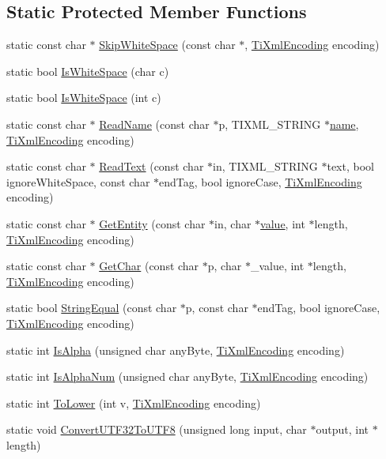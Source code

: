 \subsection*{Static Protected Member Functions}
\begin{DoxyCompactItemize}
\item 
static const char $\ast$ \hyperlink{classTiXmlBase_ac0c3d66d8a9e6996a1fa016275e16875}{SkipWhiteSpace} (const char $\ast$, \hyperlink{tinyxml_8h_a88d51847a13ee0f4b4d320d03d2c4d96}{TiXmlEncoding} encoding)
\item 
static bool \hyperlink{classTiXmlBase_af56296d561c0bab4bc8e198cdcf5c48e}{IsWhiteSpace} (char c)
\item 
static bool \hyperlink{classTiXmlBase_a3de391ea9f4c4a8aa10d04480b048795}{IsWhiteSpace} (int c)
\item 
static const char $\ast$ \hyperlink{classTiXmlBase_a1c21a6ab5f7b503acd91f35f183734b3}{ReadName} (const char $\ast$p, TIXML\_\-STRING $\ast$\hyperlink{classTiXmlAttribute_afcbe165f33f08cf9b24daa33f0ee951a}{name}, \hyperlink{tinyxml_8h_a88d51847a13ee0f4b4d320d03d2c4d96}{TiXmlEncoding} encoding)
\item 
static const char $\ast$ \hyperlink{classTiXmlBase_aa646c74921aa33156968b802bbf5566e}{ReadText} (const char $\ast$in, TIXML\_\-STRING $\ast$text, bool ignoreWhiteSpace, const char $\ast$endTag, bool ignoreCase, \hyperlink{tinyxml_8h_a88d51847a13ee0f4b4d320d03d2c4d96}{TiXmlEncoding} encoding)
\item 
static const char $\ast$ \hyperlink{classTiXmlBase_ac5c08bf3deffcda0bf8ce2958372b584}{GetEntity} (const char $\ast$in, char $\ast$\hyperlink{classTiXmlAttribute_ae9e4e5f442347434b1da43954cc1b411}{value}, int $\ast$length, \hyperlink{tinyxml_8h_a88d51847a13ee0f4b4d320d03d2c4d96}{TiXmlEncoding} encoding)
\item 
static const char $\ast$ \hyperlink{classTiXmlBase_a5b0fde72d6f662ae1fd6303195d2159b}{GetChar} (const char $\ast$p, char $\ast$\_\-value, int $\ast$length, \hyperlink{tinyxml_8h_a88d51847a13ee0f4b4d320d03d2c4d96}{TiXmlEncoding} encoding)
\item 
static bool \hyperlink{classTiXmlBase_a51631e6986179558b9e5850723ed165a}{StringEqual} (const char $\ast$p, const char $\ast$endTag, bool ignoreCase, \hyperlink{tinyxml_8h_a88d51847a13ee0f4b4d320d03d2c4d96}{TiXmlEncoding} encoding)
\item 
static int \hyperlink{classTiXmlBase_ae22522b2e8e1ac43102d16394f639fc8}{IsAlpha} (unsigned char anyByte, \hyperlink{tinyxml_8h_a88d51847a13ee0f4b4d320d03d2c4d96}{TiXmlEncoding} encoding)
\item 
static int \hyperlink{classTiXmlBase_a321919055c115c78ded17f85a793f368}{IsAlphaNum} (unsigned char anyByte, \hyperlink{tinyxml_8h_a88d51847a13ee0f4b4d320d03d2c4d96}{TiXmlEncoding} encoding)
\item 
static int \hyperlink{classTiXmlBase_a799f17405a86a5c2029618e85f11a097}{ToLower} (int v, \hyperlink{tinyxml_8h_a88d51847a13ee0f4b4d320d03d2c4d96}{TiXmlEncoding} encoding)
\item 
static void \hyperlink{classTiXmlBase_a07c765e3a7f979d343e646ea797b180b}{ConvertUTF32ToUTF8} (unsigned long input, char $\ast$output, int $\ast$length)
\end{DoxyCompactItemize}
